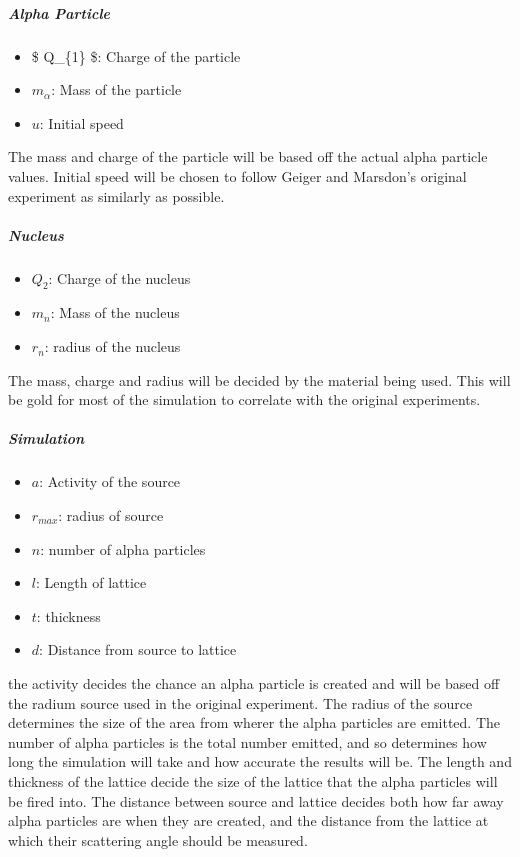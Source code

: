 \documentclass[11pt]{article}
\providecommand{\tightlist}{%
      \setlength{\itemsep}{0pt}\setlength{\parskip}{0pt}}
\begin{document}
\hypertarget{alpha-particle}{%
\subparagraph*{Alpha Particle}\label{alpha-particle}}

\begin{itemize}
\tightlist
\item
  \$ Q\_\{1\} \$: Charge of the particle
\item
  \(m_{\alpha}\): Mass of the particle
\item
  \(u\): Initial speed
\end{itemize}

The mass and charge of the particle will be based off the actual alpha
particle values. Initial speed will be chosen to follow Geiger and
Marsdon's original experiment as similarly as possible.

\hypertarget{nucleus}{%
\subparagraph*{Nucleus}\label{nucleus}}

\begin{itemize}
\tightlist
\item
  \(Q_{2}\): Charge of the nucleus
\item
  \(m_{n}\): Mass of the nucleus
\item
  \(r_{n}\): radius of the nucleus
\end{itemize}

The mass, charge and radius will be decided by the material being used.
This will be gold for most of the simulation to correlate with the
original experiments.

\hypertarget{simulation}{%
\subparagraph*{Simulation}\label{simulation}}

\begin{itemize}
\tightlist
\item
  \(a\): Activity of the source
\item
  \(r_{max}\): radius of source
\item
  \(n\): number of alpha particles
\item
  \(l\): Length of lattice
\item
  \(t\): thickness
\item
  \(d\): Distance from source to lattice
\end{itemize}

the activity decides the chance an alpha particle is created and will be
based off the radium source used in the original experiment. The radius
of the source determines the size of the area from wherer the alpha
particles are emitted. The number of alpha particles is the total number
emitted, and so determines how long the simulation will take and how
accurate the results will be. The length and thickness of the lattice
decide the size of the lattice that the alpha particles will be fired
into. The distance between source and lattice decides both how far away
alpha particles are when they are created, and the distance from the
lattice at which their scattering angle should be measured.
\end{document}
